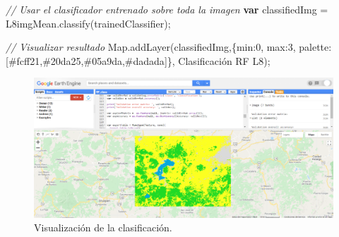 \documentclass[
  12pt,
  letterpaper,
  twoside]{book}
\newenvironment{Shaded}{\begin{snugshade}}{\end{snugshade}}
\newcommand{\CommentTok}[1]{\textcolor[rgb]{0.24,0.58,0.00}{\textit{#1}}}
\newcommand{\ControlFlowTok}[1]{\textcolor[rgb]{0.00,0.00,0.00}{\textbf{#1}}}
\newcommand{\DataTypeTok}[1]{\textcolor[rgb]{0.00,0.00,0.00}{#1}}
\newcommand{\DecValTok}[1]{\textcolor[rgb]{0.28,0.53,0.93}{#1}}
\newcommand{\FunctionTok}[1]{\textcolor[rgb]{0.48,0.12,0.64}{#1}}
\newcommand{\KeywordTok}[1]{\textcolor[rgb]{0.48,0.12,0.64}{#1}}
\newcommand{\NormalTok}[1]{#1}
\newcommand{\OperatorTok}[1]{\textcolor[rgb]{0.00,0.00,0.00}{#1}}
\newcommand{\StringTok}[1]{\textcolor[rgb]{0.87,0.29,0.22}{#1}}
\begin{document}
\begin{Shaded}
\begin{Highlighting}[]
\CommentTok{// Usar el clasificador entrenado sobre toda la imagen}
\ControlFlowTok{var}\NormalTok{ classifiedImg }\OperatorTok{=}\NormalTok{ L8imgMean}\OperatorTok{.}\FunctionTok{classify}\NormalTok{(trainedClassifier)}\OperatorTok{;}

\CommentTok{// Visualizar resultado}
\KeywordTok{Map}\OperatorTok{.}\FunctionTok{addLayer}\NormalTok{(classifiedImg}\OperatorTok{,}\NormalTok{\{}\DataTypeTok{min}\OperatorTok{:}\DecValTok{0}\OperatorTok{,} \DataTypeTok{max}\OperatorTok{:}\DecValTok{3}\OperatorTok{,} 
  \DataTypeTok{palette}\OperatorTok{:}\NormalTok{[}\StringTok{\textquotesingle{}\#fcff21\textquotesingle{}}\OperatorTok{,}\StringTok{\textquotesingle{}\#20da25\textquotesingle{}}\OperatorTok{,}\StringTok{\textquotesingle{}\#05a9da\textquotesingle{}}\OperatorTok{,}\StringTok{\textquotesingle{}\#dadada\textquotesingle{}}\NormalTok{]\}}\OperatorTok{,}
  \StringTok{\textquotesingle{}Clasificación RF L8\textquotesingle{}}\NormalTok{)}\OperatorTok{;}
\end{Highlighting}
\end{Shaded}

\begin{figure}[H]

{\centering \includegraphics[width=0.95\linewidth]{Img/RFClass} 

}

\caption{Visualización de la clasificación.}\label{fig:fc123}
\end{figure}
\end{document}
